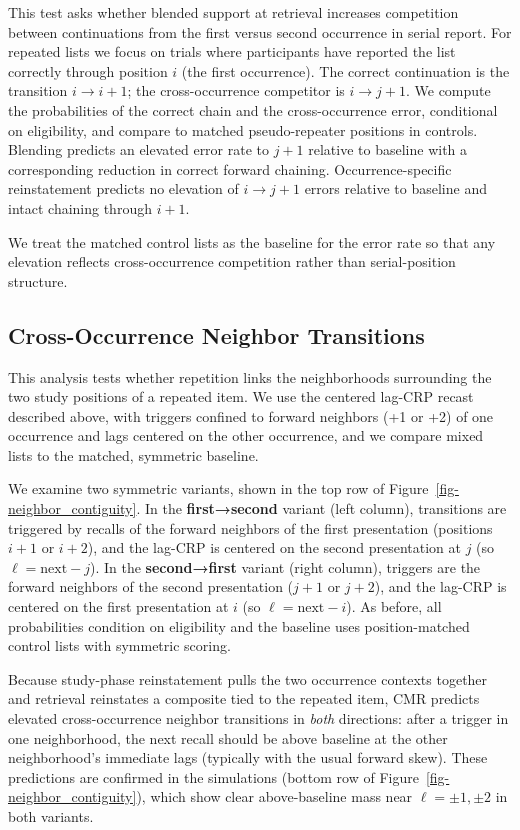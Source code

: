 \documentclass[
  man,
  floatsintext,
  longtable,
  nolmodern,
  notxfonts,
  notimes,
  draftfirst,
  colorlinks=true,linkcolor=blue,citecolor=blue,urlcolor=blue]{apa7}
\begin{document}
This test asks whether blended support at retrieval increases
competition between continuations from the first versus second
occurrence in serial report. For repeated lists we focus on trials where
participants have reported the list correctly through position \(i\)
(the first occurrence). The correct continuation is the transition
\(i\rightarrow i{+}1\); the cross-occurrence competitor is
\(i\rightarrow j{+}1\). We compute the probabilities of the correct
chain and the cross-occurrence error, conditional on eligibility, and
compare to matched pseudo-repeater positions in controls. Blending
predicts an elevated error rate to \(j{+}1\) relative to baseline with a
corresponding reduction in correct forward chaining. Occurrence-specific
reinstatement predicts no elevation of \(i\rightarrow j{+}1\) errors
relative to baseline and intact chaining through \(i{+}1\).

We treat the matched control lists as the baseline for the error rate so
that any elevation reflects cross-occurrence competition rather than
serial-position structure.

\subsection{Cross-Occurrence Neighbor
Transitions}\label{cross-occurrence-neighbor-transitions}

This analysis tests whether repetition links the neighborhoods
surrounding the two study positions of a repeated item. We use the
centered lag-CRP recast described above, with triggers confined to
forward neighbors (+1 or +2) of one occurrence and lags centered on the
other occurrence, and we compare mixed lists to the matched, symmetric
baseline.

We examine two symmetric variants, shown in the top row of
Figure~\ref{fig-neighbor_contiguity}. In the \textbf{first→second}
variant (left column), transitions are triggered by recalls of the
forward neighbors of the first presentation (positions \(i{+}1\) or
\(i{+}2\)), and the lag-CRP is centered on the second presentation at
\(j\) (so \(\ell=\text{next}-j\)). In the \textbf{second→first} variant
(right column), triggers are the forward neighbors of the second
presentation (\(j{+}1\) or \(j{+}2\)), and the lag-CRP is centered on
the first presentation at \(i\) (so \(\ell=\text{next}-i\)). As before,
all probabilities condition on eligibility and the baseline uses
position-matched control lists with symmetric scoring.

Because study-phase reinstatement pulls the two occurrence contexts
together and retrieval reinstates a composite tied to the repeated item,
CMR predicts elevated cross-occurrence neighbor transitions in
\emph{both} directions: after a trigger in one neighborhood, the next
recall should be above baseline at the other neighborhood's immediate
lags (typically with the usual forward skew). These predictions are
confirmed in the simulations (bottom row of
Figure~\ref{fig-neighbor_contiguity}), which show clear above-baseline
mass near \(\ell=\pm1,\pm2\) in both variants.
\end{document}
